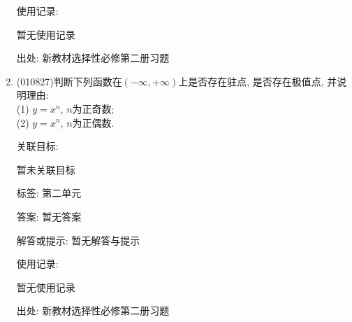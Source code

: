 \documentclass[10pt,a4paper]{article}
\begin{document}
\begin{enumerate}[1.]
使用记录:

暂无使用记录


出处: 新教材选择性必修第二册习题
\item { (010827)}判断下列函数在$(-\infty, +\infty)$上是否存在驻点, 是否存在极值点, 并说明理由:\\
(1) $y=x^n$, $n$为正奇数;\\
(2) $y=x^n$, $n$为正偶数.


关联目标:

暂未关联目标



标签: 第二单元

答案: 暂无答案

解答或提示: 暂无解答与提示

使用记录:

暂无使用记录


出处: 新教材选择性必修第二册习题
\end{enumerate}
\end{document}
